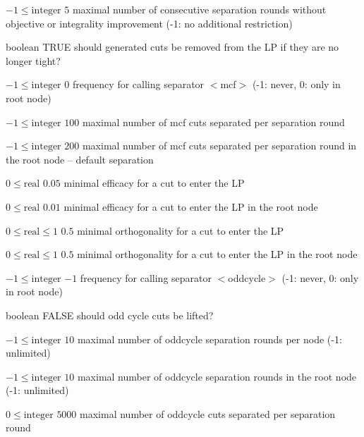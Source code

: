 %
{$-1\leq\textrm{integer}$}%
{$5$}%
{maximal number of consecutive separation rounds without objective or integrality improvement (-1: no additional restriction)}%
{}

%
{boolean}%
{TRUE}%
{should generated cuts be removed from the LP if they are no longer tight?}%
{}

%
{$-1\leq\textrm{integer}$}%
{$0$}%
{frequency for calling separator $<$mcf$>$ (-1: never, 0: only in root node)}%
{}

%
{$-1\leq\textrm{integer}$}%
{$100$}%
{maximal number of mcf cuts separated per separation round}%
{}

%
{$-1\leq\textrm{integer}$}%
{$200$}%
{maximal number of mcf cuts separated per separation round in the root node  -- default separation}%
{}

%
{$0\leq\textrm{real}$}%
{$0.05$}%
{minimal efficacy for a cut to enter the LP}%
{}

%
{$0\leq\textrm{real}$}%
{$0.01$}%
{minimal efficacy for a cut to enter the LP in the root node}%
{}

%
{$0\leq\textrm{real}\leq1$}%
{$0.5$}%
{minimal orthogonality for a cut to enter the LP}%
{}

%
{$0\leq\textrm{real}\leq1$}%
{$0.5$}%
{minimal orthogonality for a cut to enter the LP in the root node}%
{}

%
{$-1\leq\textrm{integer}$}%
{$-1$}%
{frequency for calling separator $<$oddcycle$>$ (-1: never, 0: only in root node)}%
{}

%
{boolean}%
{FALSE}%
{should odd cycle cuts be lifted?}%
{}

%
{$-1\leq\textrm{integer}$}%
{$10$}%
{maximal number of oddcycle separation rounds per node (-1: unlimited)}%
{}

%
{$-1\leq\textrm{integer}$}%
{$10$}%
{maximal number of oddcycle separation rounds in the root node (-1: unlimited)}%
{}

%
{$0\leq\textrm{integer}$}%
{$5000$}%
{maximal number of oddcycle cuts separated per separation round}%
{}

